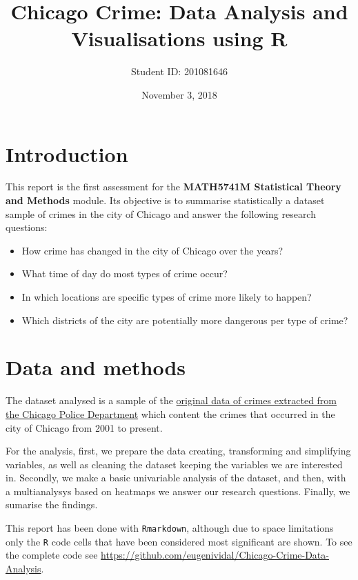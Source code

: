 \documentclass[]{article}
\title{Chicago Crime: Data Analysis and Visualisations using R}
\author{Student ID: 201081646}
\date{November 3, 2018}
\begin{document}
\maketitle

\section{Introduction}\label{introduction}

This report is the first assessment for the \textbf{MATH5741M
Statistical Theory and Methods} module. Its objective is to summarise
statistically a dataset sample of crimes in the city of Chicago and
answer the following research questions:

\begin{itemize}
\item
  How crime has changed in the city of Chicago over the years?
\item
  What time of day do most types of crime occur?
\item
  In which locations are specific types of crime more likely to happen?
\item
  Which districts of the city are potentially more dangerous per type of
  crime?
\end{itemize}

\section{Data and methods}\label{data-and-methods}

The dataset analysed is a sample of the
\href{https://data.cityofchicago.org/Public-Safety/Crimes-2001-to-present/ijzp-q8t2}{original
data of crimes extracted from the Chicago Police Department} which
content the crimes that occurred in the city of Chicago from 2001 to
present.

For the analysis, first, we prepare the data creating, transforming and
simplifying variables, as well as cleaning the dataset keeping the
variables we are interested in. Secondly, we make a basic univariable
analysis of the dataset, and then, with a multianalysys based on
heatmaps we answer our research questions. Finally, we sumarise the
findings.

This report has been done with \texttt{Rmarkdown}, although due to space
limitations only the \texttt{R} code cells that have been considered
most significant are shown. To see the complete code see
\url{https://github.com/eugenividal/Chicago-Crime-Data-Analysis}.
\end{document}
